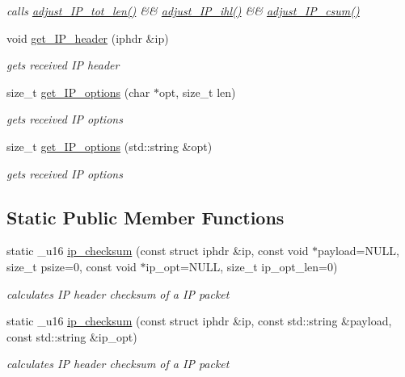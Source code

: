 \begin{CompactItemize}
\begin{CompactList}\small\item\em calls \hyperlink{classsocketpp_1_1IP__RawSocket_32d2c08139fb43abb92679bdabecf778}{adjust\_\-IP\_\-tot\_\-len()} \&\& \hyperlink{classsocketpp_1_1IP__RawSocket_d84d5e193a15baf421c64011a9c27359}{adjust\_\-IP\_\-ihl()} \&\& \hyperlink{classsocketpp_1_1IP__RawSocket_187bab79c6a8bae17b400a132063a9d1}{adjust\_\-IP\_\-csum()} \item\end{CompactList}\item 
void \hyperlink{classsocketpp_1_1IP__RawSocket_e477f483d5a8baa76c60399d0809d043}{get\_\-IP\_\-header} (iphdr \&ip)
\begin{CompactList}\small\item\em gets received IP header \item\end{CompactList}\item 
size\_\-t \hyperlink{classsocketpp_1_1IP__RawSocket_686fcc72997b0843b2ece0c4d8a5735d}{get\_\-IP\_\-options} (char $\ast$opt, size\_\-t len)
\begin{CompactList}\small\item\em gets received IP options \item\end{CompactList}\item 
size\_\-t \hyperlink{classsocketpp_1_1IP__RawSocket_c9bec0c1db60871bb1cb5560b97e02ed}{get\_\-IP\_\-options} (std::string \&opt)
\begin{CompactList}\small\item\em gets received IP options \item\end{CompactList}\end{CompactItemize}
\subsection*{Static Public Member Functions}
\begin{CompactItemize}
\item 
static \_\-u16 \hyperlink{classsocketpp_1_1IP__RawSocket_91cc7b27ebb5eb8da6be6cdd14087f21}{ip\_\-checksum} (const struct iphdr \&ip, const void $\ast$payload=NULL, size\_\-t psize=0, const void $\ast$ip\_\-opt=NULL, size\_\-t ip\_\-opt\_\-len=0)
\begin{CompactList}\small\item\em calculates IP header checksum of a IP packet \item\end{CompactList}\item 
static \_\-u16 \hyperlink{classsocketpp_1_1IP__RawSocket_6b48548362fb5509bbba7d36e9ffdb5d}{ip\_\-checksum} (const struct iphdr \&ip, const std::string \&payload, const std::string \&ip\_\-opt)
\begin{CompactList}\small\item\em calculates IP header checksum of a IP packet \item\end{CompactList}\end{CompactItemize}
